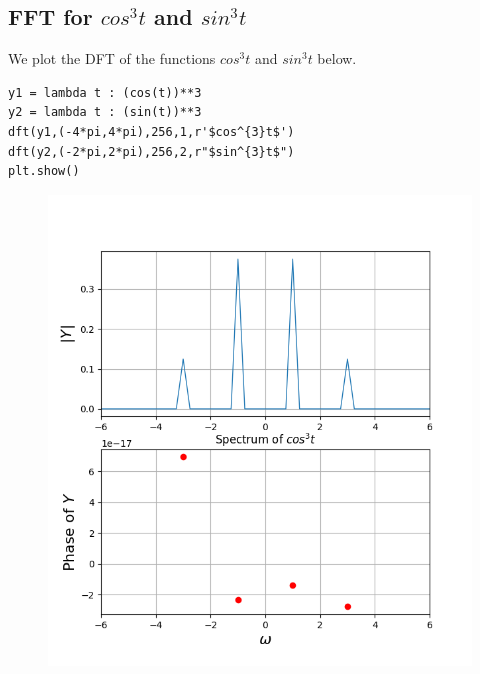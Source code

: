 \documentclass[11pt, a4paper]{article}
\begin{document}
\subsection{FFT for $cos^{3}t$ and $sin^{3}t$}
{
We plot the DFT of the functions $cos^{3}t$ and $sin^{3}t$
below.
}
\begin{verbatim}
y1 = lambda t : (cos(t))**3
y2 = lambda t : (sin(t))**3
dft(y1,(-4*pi,4*pi),256,1,r'$cos^{3}t$')
dft(y2,(-2*pi,2*pi),256,2,r"$sin^{3}t$")
plt.show()
\end{verbatim}
\begin{figure}[!tbh]
   	\centering
   	\includegraphics[scale=0.5]{img5.png}
   	\label{fig:32}
   \end{figure}
\end{document}
